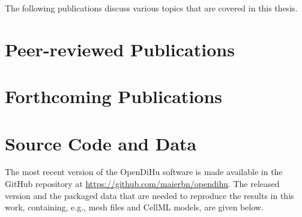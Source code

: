 



\nocite{Bradley:2018:EDB}
\nocite{Maier2019}
\nocite{Maier2021}
\nocite{summerschool2019}
\nocite{hlrs2020}
\nocite{MaierSubmitted2}
\nocite{MaierSubmitted}
\nocite{hlrs2021}
\nocite{maier_benjamin_2021_4705945}
\nocite{opendihu}


  
  
The following publications discuss various topics that are covered in this thesis.

\section*{Peer-reviewed Publications}
\printbibliography[category=own,heading=none,title=]

\section*{Forthcoming Publications}
\printbibliography[category=own_forthcoming,heading=none,title=]

\section*{Source Code and Data}
The most recent version of the OpenDiHu software is made available in the GitHub repository at \url{https://github.com/maierbn/opendihu}. 
The released version and the packaged data that are needed to reproduce the results in this work, containing, e.g., mesh files and CellML models, are given below.

\printbibliography[category=own_other,heading=none,title=]


